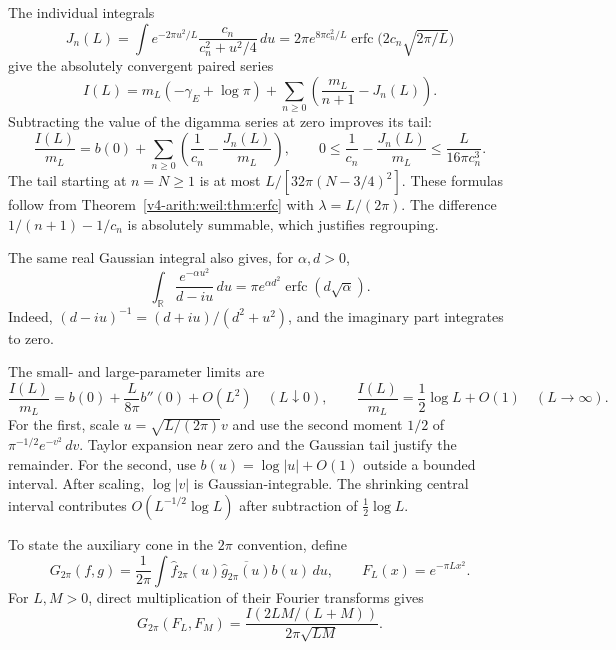 The individual integrals
\[
 J_n(L)=\int e^{-2\pi u^2/L}\frac{c_n}{c_n^2+u^2/4}\,du
       =2\pi e^{8\pi c_n^2/L}
                 \operatorname{erfc}\bigl(2c_n\sqrt{2\pi/L}\bigr)
\]
give the absolutely convergent paired series
\[
 I(L)=m_L(-\gamma_E+\log\pi)
               +\sum_{n\ge0}\left(\frac{m_L}{n+1}-J_n(L)\right).
\]
Subtracting the value of the digamma series at zero improves its tail:
\begin{equation}
 \frac{I(L)}{m_L}=b(0)+
      \sum_{n\ge0}\left(\frac1{c_n}-\frac{J_n(L)}{m_L}\right),
 \qquad
 0\le\frac1{c_n}-\frac{J_n(L)}{m_L}
                     \le\frac{L}{16\pi c_n^3}.
 \label{v4-arith:weil:eq:auxiliary-series}
\end{equation}
The tail starting at \(n=N\ge1\) is at most
\(L/[32\pi(N-3/4)^2]\).
These formulas follow from Theorem~\ref{v4-arith:weil:thm:erfc}
with \(\lambda=L/(2\pi)\). The difference
\(1/(n+1)-1/c_n\) is absolutely summable, which justifies regrouping.

The same real Gaussian integral also gives, for \(\alpha,d>0\),
\[
 \int_{\mathbb R}\frac{e^{-\alpha u^2}}{d-iu}\,du
       =\pi e^{\alpha d^2}\operatorname{erfc}(d\sqrt\alpha).
\]
Indeed, \((d-iu)^{-1}=(d+iu)/(d^2+u^2)\), and the imaginary part
integrates to zero.

The small- and large-parameter limits are
\begin{equation}
 \frac{I(L)}{m_L}
       =b(0)+\frac{L}{8\pi}b''(0)+O(L^2)
                         \quad(L\downarrow0),\qquad
 \frac{I(L)}{m_L}=\frac12\log L+O(1)
                         \quad(L\to\infty).
 \label{v4-arith:weil:eq:auxiliary-limits}
\end{equation}
For the first, scale \(u=\sqrt{L/(2\pi)}v\) and use the second
moment \(1/2\) of \(\pi^{-1/2}e^{-v^2}\,dv\).
Taylor expansion near zero and the Gaussian tail justify the remainder.
For the second, use \(b(u)=\log|u|+O(1)\) outside a bounded interval.
After scaling, \(\log|v|\) is Gaussian-integrable.
The shrinking central interval contributes
\(O(L^{-1/2}\log L)\) after subtraction of \(\tfrac12\log L\).

To state the auxiliary cone in the \(2\pi\) convention, define
\[
 G_{2\pi}(f,g)=\frac1{2\pi}\int
       \widehat f_{2\pi}(u)\overline{\widehat g_{2\pi}(u)}b(u)\,du,
 \qquad F_L(x)=e^{-\pi Lx^2}.
\]
For \(L,M>0\), direct multiplication of their Fourier transforms gives
\begin{equation}
 G_{2\pi}(F_L,F_M)
       =\frac{I(2LM/(L+M))}{2\pi\sqrt{LM}}.
 \label{v4-arith:weil:eq:auxiliary-cross}
\end{equation}

